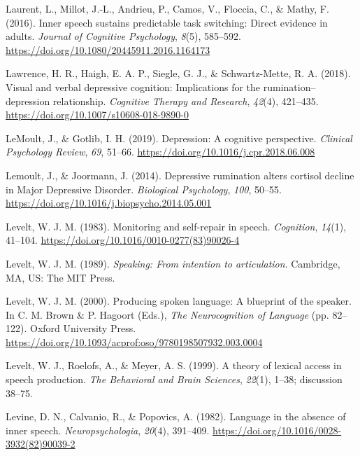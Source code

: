 \documentclass[a4paper,12pt,twoside,onecolumn,openright,final,oldfontcommands]{memoir}
\begin{document}
\leavevmode\hypertarget{ref-Laurent2016}{}%
Laurent, L., Millot, J.-L., Andrieu, P., Camos, V., Floccia, C., \& Mathy, F. (2016). Inner speech sustains predictable task switching: Direct evidence in adults. \emph{Journal of Cognitive Psychology}, \emph{8}(5), 585--592. \url{https://doi.org/10.1080/20445911.2016.1164173}

\leavevmode\hypertarget{ref-lawrence_visual_2018}{}%
Lawrence, H. R., Haigh, E. A. P., Siegle, G. J., \& Schwartz-Mette, R. A. (2018). Visual and verbal depressive cognition: Implications for the rumination--depression relationship. \emph{Cognitive Therapy and Research}, \emph{42}(4), 421--435. \url{https://doi.org/10.1007/s10608-018-9890-0}

\leavevmode\hypertarget{ref-lemoult_depression_2019}{}%
LeMoult, J., \& Gotlib, I. H. (2019). Depression: A cognitive perspective. \emph{Clinical Psychology Review}, \emph{69}, 51--66. \url{https://doi.org/10.1016/j.cpr.2018.06.008}

\leavevmode\hypertarget{ref-Lemoult2014}{}%
Lemoult, J., \& Joormann, J. (2014). Depressive rumination alters cortisol decline in Major Depressive Disorder. \emph{Biological Psychology}, \emph{100}, 50--55. \url{https://doi.org/10.1016/j.biopsycho.2014.05.001}

\leavevmode\hypertarget{ref-levelt_monitoring_1983}{}%
Levelt, W. J. M. (1983). Monitoring and self-repair in speech. \emph{Cognition}, \emph{14}(1), 41--104. \url{https://doi.org/10.1016/0010-0277(83)90026-4}

\leavevmode\hypertarget{ref-levelt_speaking_1989}{}%
Levelt, W. J. M. (1989). \emph{Speaking: From intention to articulation}. Cambridge, MA, US: The MIT Press.

\leavevmode\hypertarget{ref-brown_producing_2000}{}%
Levelt, W. J. M. (2000). Producing spoken language: A blueprint of the speaker. In C. M. Brown \& P. Hagoort (Eds.), \emph{The Neurocognition of Language} (pp. 82--122). Oxford University Press. \url{https://doi.org/10.1093/acprof:oso/9780198507932.003.0004}

\leavevmode\hypertarget{ref-levelt_theory_1999}{}%
Levelt, W. J., Roelofs, A., \& Meyer, A. S. (1999). A theory of lexical access in speech production. \emph{The Behavioral and Brain Sciences}, \emph{22}(1), 1--38; discussion 38--75.

\leavevmode\hypertarget{ref-levine_language_1982}{}%
Levine, D. N., Calvanio, R., \& Popovics, A. (1982). Language in the absence of inner speech. \emph{Neuropsychologia}, \emph{20}(4), 391--409. \url{https://doi.org/10.1016/0028-3932(82)90039-2}
\end{document}
